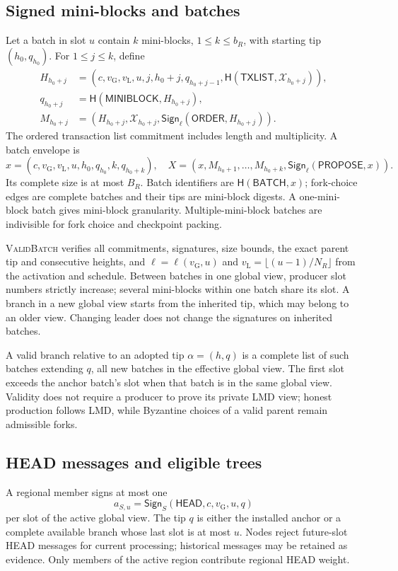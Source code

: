 \documentclass[11pt,a4paper,onecolumn]{article}
\newcommand{\Hash}{\mathsf H}
\newcommand{\Sig}{\mathsf{Sign}}
\newcommand{\gv}{v_{\mathrm G}}
\newcommand{\lv}{v_{\mathrm L}}
\newcommand{\Tag}[1]{\mathsf{#1}}
\newcommand{\Proc}[1]{\textnormal{\textsc{#1}}}
\theoremstyle{remark}\newtheorem{example}[definition]{Example}
\begin{document}
\subsection{Signed mini-blocks and batches}
Let a batch in slot $u$ contain $k$ mini-blocks, $1\leq k\leq b_R$, with
starting tip $(h_0,q_{h_0})$. For $1\leq j\leq k$, define
\begin{align}
 H_{h_0+j}&=(c,\gv,\lv,u,j,h_0+j,q_{h_0+j-1},
                    \Hash(\Tag{TXLIST},\mathcal X_{h_0+j})),\label{eq:block}\\
 q_{h_0+j}&=\Hash(\Tag{MINIBLOCK},H_{h_0+j}),\nonumber\\
 M_{h_0+j}&=(H_{h_0+j},\mathcal X_{h_0+j},
                \Sig_\ell(\Tag{ORDER},H_{h_0+j})).\nonumber
\end{align}
The ordered transaction list commitment includes length and multiplicity.
A batch envelope is
\begin{equation}\label{eq:proposal}
 x=(c,\gv,\lv,u,h_0,q_{h_0},k,q_{h_0+k}),\quad
 X=(x,M_{h_0+1},\ldots,M_{h_0+k},\Sig_\ell(\Tag{PROPOSE},x)).
\end{equation}
Its complete size is at most $B_R$. Batch identifiers are $\Hash(\Tag{BATCH},x)$;
fork-choice edges are complete batches and their tips are mini-block digests.
A one-mini-block batch gives mini-block granularity. Multiple-mini-block
batches are indivisible for fork choice and checkpoint packing.

\Proc{ValidBatch} verifies all commitments, signatures, size bounds,
the exact parent tip and consecutive heights, and $\ell=\ell(\gv,u)$ and
$\lv=\lfloor(u-1)/N_R\rfloor$ from the activation and schedule.
Between batches in one global view, producer slot numbers strictly increase;
several mini-blocks within one batch share its slot. A branch in a new global
view starts from the inherited tip, which may belong to an older view.
Changing leader does not change the signatures on inherited batches.

A valid branch relative to an adopted tip $\alpha=(h,q)$ is a complete list
of such batches extending $q$, all new batches in the effective global view.
The first slot exceeds the anchor batch's slot when that batch is in the same
global view. Validity does not require a producer to prove its private LMD
view; honest production follows LMD, while Byzantine choices of a valid parent
remain admissible forks.

\subsection{HEAD messages and eligible trees}\label{sec:headobjects}
A regional member signs at most one
\[
 a_{S,u}=\Sig_S(\Tag{HEAD},c,\gv,u,q)
\]
per slot of the active global view. The tip $q$ is either the installed anchor
or a complete available branch whose last slot is at most $u$.
Nodes reject future-slot HEAD messages for current processing; historical
messages may be retained as evidence. Only members of the active region
contribute regional HEAD weight.
\end{document}

